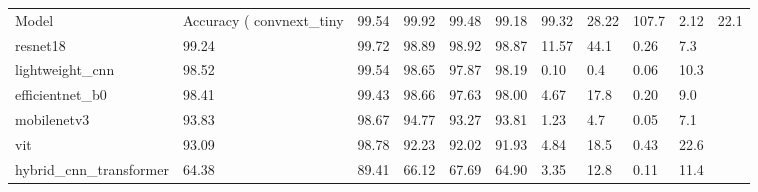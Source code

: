 \begin{tabular}{llllllllll}
\toprule
Model & Accuracy (%
\midrule
convnext_tiny & 99.54 & 99.92 & 99.48 & 99.18 & 99.32 & 28.22 & 107.7 & 2.12 & 22.1 \\
resnet18 & 99.24 & 99.72 & 98.89 & 98.92 & 98.87 & 11.57 & 44.1 & 0.26 & 7.3 \\
lightweight_cnn & 98.52 & 99.54 & 98.65 & 97.87 & 98.19 & 0.10 & 0.4 & 0.06 & 10.3 \\
efficientnet_b0 & 98.41 & 99.43 & 98.66 & 97.63 & 98.00 & 4.67 & 17.8 & 0.20 & 9.0 \\
mobilenetv3 & 93.83 & 98.67 & 94.77 & 93.27 & 93.81 & 1.23 & 4.7 & 0.05 & 7.1 \\
vit & 93.09 & 98.78 & 92.23 & 92.02 & 91.93 & 4.84 & 18.5 & 0.43 & 22.6 \\
hybrid_cnn_transformer & 64.38 & 89.41 & 66.12 & 67.69 & 64.90 & 3.35 & 12.8 & 0.11 & 11.4 \\
\bottomrule
\end{tabular}
